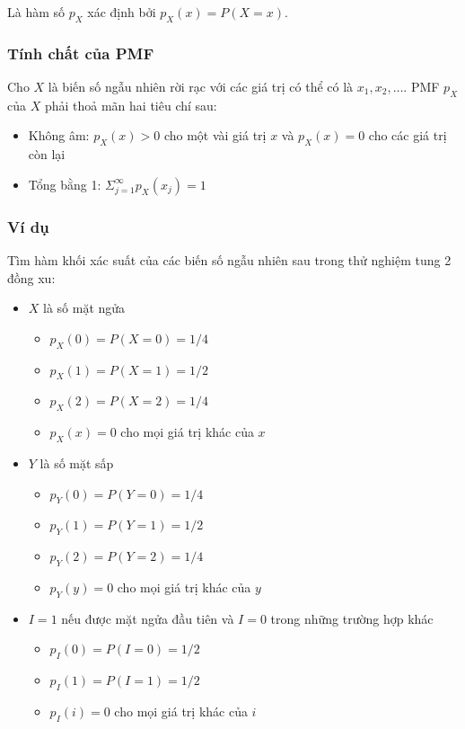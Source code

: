 \documentclass[
]{book}
\providecommand{\tightlist}{%
  \setlength{\itemsep}{0pt}\setlength{\parskip}{0pt}}
\begin{document}
Là hàm số \(p_X\) xác định bởi \(p_X(x) = P(X = x)\).

\hypertarget{tuxednh-chux1ea5t-cux1ee7a-pmf}{%
\subsubsection{Tính chất của PMF}\label{tuxednh-chux1ea5t-cux1ee7a-pmf}}

Cho \(X\) là biến số ngẫu nhiên rời rạc với các giá trị có thể có là \(x_1, x_2, \ldots\). PMF \(p_X\) của \(X\) phải thoả mãn hai tiêu chí sau:

\begin{itemize}
\tightlist
\item
  Không âm: \(p_X(x) > 0\) cho một vài giá trị \(x\) và \(p_X(x) = 0\) cho các giá trị còn lại
\item
  Tổng bằng 1: \(\Sigma^\infty_{j = 1}p_X(x_j) = 1\)
\end{itemize}

\hypertarget{vuxed-dux1ee5-1}{%
\subsubsection{Ví dụ}\label{vuxed-dux1ee5-1}}

Tìm hàm khối xác suất của các biến số ngẫu nhiên sau trong thử nghiệm tung 2 đồng xu:

\begin{itemize}
\tightlist
\item
  \(X\) là số mặt ngửa

  \begin{itemize}
  \tightlist
  \item
    \(p_X(0) = P(X = 0) = 1/4\)
  \item
    \(p_X(1) = P(X = 1) = 1/2\)
  \item
    \(p_X(2) = P(X = 2) = 1/4\)
  \item
    \(p_X(x) = 0\) cho mọi giá trị khác của \(x\)
  \end{itemize}
\item
  \(Y\) là số mặt sấp

  \begin{itemize}
  \tightlist
  \item
    \(p_Y(0) = P(Y = 0) = 1/4\)
  \item
    \(p_Y(1) = P(Y = 1) = 1/2\)
  \item
    \(p_Y(2) = P(Y = 2) = 1/4\)
  \item
    \(p_Y(y) = 0\) cho mọi giá trị khác của \(y\)
  \end{itemize}
\item
  \(I = 1\) nếu được mặt ngửa đầu tiên và \(I = 0\) trong những trường hợp khác

  \begin{itemize}
  \tightlist
  \item
    \(p_I(0) = P(I = 0) = 1/2\)
  \item
    \(p_I(1) = P(I = 1) = 1/2\)
  \item
    \(p_I(i) = 0\) cho mọi giá trị khác của \(i\)
  \end{itemize}
\end{itemize}
\end{document}
